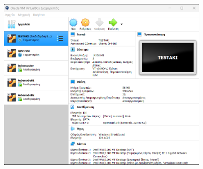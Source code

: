 \begin{figure}[htb]
	\centering
	\includegraphics[width=0.9\textwidth]{graphics/virtualbox.PNG}
	\caption{ }
\end{figure}






